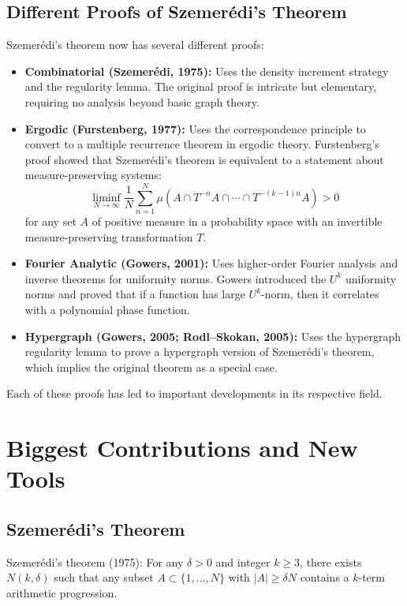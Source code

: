 \subsection{Different Proofs of Szemer\'edi's Theorem}

Szemer\'edi's theorem now has several different proofs:
\begin{itemize}
\item \textbf{Combinatorial (Szemer\'edi, 1975):} Uses the density increment strategy and the regularity lemma. The original proof is intricate but elementary, requiring no analysis beyond basic graph theory.
\item \textbf{Ergodic (Furstenberg, 1977):} Uses the correspondence principle to convert to a multiple recurrence theorem in ergodic theory. Furstenberg's proof showed that Szemer\'edi's theorem is equivalent to a statement about measure-preserving systems:
\[
\liminf_{N \to \infty} \frac{1}{N}\sum_{n=1}^N \mu(A \cap T^{-n}A \cap \cdots \cap T^{-(k-1)n}A) > 0
\]
for any set $A$ of positive measure in a probability space with an invertible measure-preserving transformation $T$.
\item \textbf{Fourier Analytic (Gowers, 2001):} Uses higher-order Fourier analysis and inverse theorems for uniformity norms. Gowers introduced the $U^k$ uniformity norms and proved that if a function has large $U^k$-norm, then it correlates with a polynomial phase function.
\item \textbf{Hypergraph (Gowers, 2005; Rodl--Skokan, 2005):} Uses the hypergraph regularity lemma to prove a hypergraph version of Szemer\'edi's theorem, which implies the original theorem as a special case.
\end{itemize}

Each of these proofs has led to important developments in its respective field.

\section{Biggest Contributions and New Tools}

\subsection{Szemer\'edi's Theorem}

Szemer\'edi's theorem (1975): For any $\delta > 0$ and integer $k \geq 3$, there exists $N(k, \delta)$ such that any subset $A \subset \{1, \ldots, N\}$ with $|A| \geq \delta N$ contains a $k$-term arithmetic progression.

